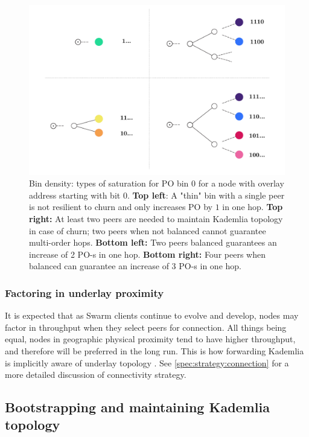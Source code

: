 \begin{figure}[htbp]
   \centering
   \includegraphics[width=\textwidth]{fig/bindensity.pdf}
   \caption[Bin density \statusgreen]{Bin density:  types of saturation for PO bin $0$ for a node with overlay address starting with bit $0$. \textbf{Top left}: A "thin" bin with a single peer is not resilient to churn and only increases PO by $1$ in one hop. \textbf{Top right:} At least two peers are needed to maintain Kademlia topology in case of churn; two peers when not balanced cannot guarantee multi-order hops. \textbf{Bottom left:} Two peers balanced guarantees an increase of 2 PO-s in one hop. \textbf{Bottom right:} Four peers when balanced can guarantee an increase of $3$ PO-s in one hop.}
   \label{fig:bindensity}
\end{figure}

\subsubsection{Factoring in underlay proximity}
It is expected that as Swarm clients continue to evolve and develop, nodes may factor in throughput when they select peers for connection. All things being equal, nodes in geographic physical proximity tend to have higher throughput, and therefore will be preferred in the long run. This is how forwarding Kademlia is implicitly aware of underlay topology \cite{heep2010r}. See \ref{spec:strategy:connection} for a more detailed discussion of connectivity strategy.


\subsection{Bootstrapping and maintaining Kademlia topology \statusgreen}\label{sec:bootstrapping}
 
